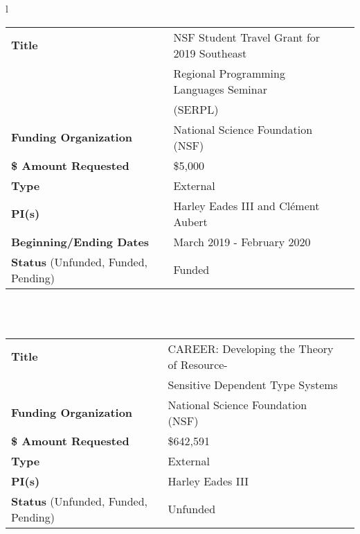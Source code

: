 \documentclass[11pt]{article}
\begin{document}
\begin{tabular}{l}
        \\
        \begin{tabular}{|l|l|l|}
          \hline
          \textbf{Title} & NSF Student Travel Grant for 2019 Southeast\,\,\,\\
          & Regional Programming Languages Seminar \\
          & (SERPL)\\
          \hline
          \textbf{Funding Organization} & National Science Foundation (NSF)\\
          \hline
          \textbf{\$ Amount Requested} & \$5,000\\
          \hline
          \textbf{Type} & External\\
          \hline
          \textbf{PI(s)} & Harley Eades III and Cl\'ement Aubert\\
          \hline
          \textbf{Beginning/Ending Dates} & March 2019 - February 2020\\
          \hline
          \textbf{Status} (Unfunded, Funded, Pending) & Funded\\
          \hline
        \end{tabular}\\
        \\
        \begin{tabular}{|l|l|l|}
          \hline
          \textbf{Title} & CAREER: Developing the Theory of Resource-\\
                         & Sensitive Dependent Type Systems \\
          \hline
          \textbf{Funding Organization} & National Science Foundation (NSF)\\
          \hline
          \textbf{\$ Amount Requested} & \$642,591\\
          \hline
          \textbf{Type} & External\\
          \hline
          \textbf{PI(s)} & Harley Eades III\\
          \hline
          \textbf{Status} (Unfunded, Funded, Pending) & Unfunded\\
          \hline
        \end{tabular}\\
        \\        
    \end{tabular}
    \\
\end{document}
